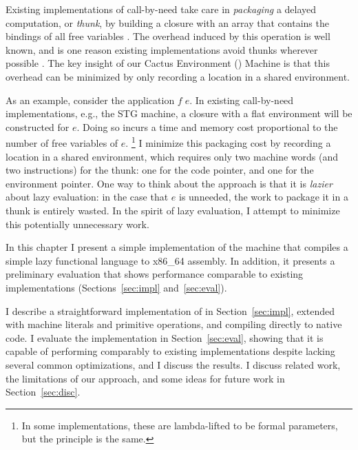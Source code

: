 Existing implementations of call-by-need take care in \emph{packaging} a delayed
computation, or \emph{thunk}, by building a closure with an array that contains
the bindings of all free variables \cite{jonesstg,boquist1997grin}. The overhead
induced by this operation is well known, and is one reason existing
implementations avoid thunks wherever possible \cite{johnsson1984efficient}. The
key insight of our Cactus Environment (\ce) Machine is that this overhead can be
minimized by only recording a location in a shared environment.

As an example, consider the application $f \; e$. In existing call-by-need
implementations, e.g., the STG machine\cite{jonesstg}, a closure with a flat
environment will be constructed for $e$.  Doing so incurs a time and memory cost
proportional to the number of free variables of $e$. \footnote{In some
implementations, these are lambda-lifted to be formal parameters, but the
principle is the same.} I minimize this packaging cost by recording a
location in a shared environment, which requires only two
machine words (and two instructions) for the thunk: one for the code pointer,
and one for the environment pointer. One way to think about the approach is that
it is \emph{lazier} about lazy evaluation: in the case that $e$ is unneeded, the
work to package it in a thunk is entirely wasted. In the spirit of lazy
evaluation, I attempt to minimize this potentially unnecessary work.  

In this chapter I present a simple implementation of the \ce machine that
compiles a simple lazy functional language to x86\_64 assembly. In addition, it
presents a preliminary evaluation that shows performance comparable to existing
implementations (Sections~\ref{sec:impl} and~\ref{sec:eval}). 

I describe a straightforward implementation of \ce in Section~\ref{sec:impl},
extended with machine literals and primitive operations, and compiling directly
to native code. I evaluate the implementation in Section~\ref{sec:eval},
showing that it is capable of performing comparably to existing implementations
despite lacking several common optimizations, and I discuss the results. I
discuss related work, the limitations of our approach, and some ideas for future
work in Section~\ref{sec:disc}.
